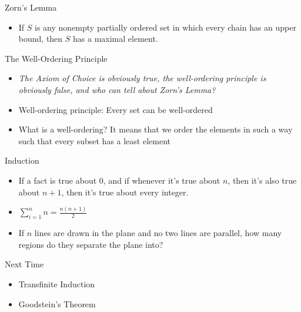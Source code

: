 \documentclass{beamer}
\begin{document}
\begin{frame}{Zorn's Lemma}
\begin{itemize}
\item If $S$ is any nonempty partially ordered set in which every chain has an upper bound, then $S$ has a maximal element.
\end{itemize}
\end{frame}

\begin{frame}{The Well-Ordering Principle}
\begin{itemize}
\item \textit{The Axiom of Choice is obviously true, the well-ordering principle is obviously false, and who can tell about Zorn's Lemma?}
\item Well-ordering principle: Every set can be well-ordered
\item What is a well-ordering? It means that we order the elements in such a way such that every subset has a least element
\end{itemize}
\end{frame}

\begin{frame}{Induction}
\begin{itemize}
\item If a fact is true about 0, and if whenever it's true about $n$, then it's also true about $n+1$, then it's true about every integer.
\item $\sum_{i=1}^n n = \frac{n(n+1)}{2}$
\item If $n$ lines are drawn in the plane and no two lines are parallel, how many regions do they separate the plane into?
\end{itemize}
\end{frame}

\begin{frame}{Next Time}
\begin{itemize}
\item Transfinite Induction
\item Goodstein's Theorem
\end{itemize}
\end{frame}
\end{document}
